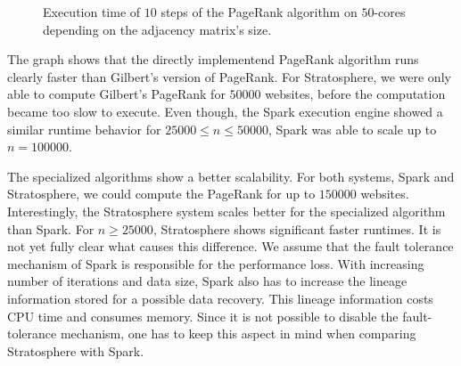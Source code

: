 \begin{figure}
	\centering
	\caption{Execution time of $10$ steps of the PageRank algorithm on $50$-cores depending on the adjacency matrix's size.}
	\label{fig:pageRankResults}
\end{figure}

The graph shows that the directly implementend PageRank algorithm runs clearly faster than Gilbert's version of PageRank.
For Stratosphere, we were only able to compute Gilbert's PageRank for $50000$ websites, before the computation became too slow to execute.
Even though, the Spark execution engine showed a similar runtime behavior for $25000 \le n \le 50000$, Spark was able to scale up to $n=100000$.

The specialized algorithms show a better scalability.
For both systems, Spark and Stratosphere, we could compute the PageRank for up to $150000$ websites.
Interestingly, the Stratosphere system scales better for the specialized algorithm than Spark.
For $n\ge 25000$, Stratosphere shows significant faster runtimes.
It is not yet fully clear what causes this difference.
We assume that the fault tolerance mechanism of Spark is responsible for the performance loss.
With increasing number of iterations and data size, Spark also has to increase the lineage information stored for a possible data recovery.
This lineage information costs CPU time and consumes memory.
Since it is not possible to disable the fault-tolerance mechanism, one has to keep this aspect in mind when comparing Stratosphere with Spark.

